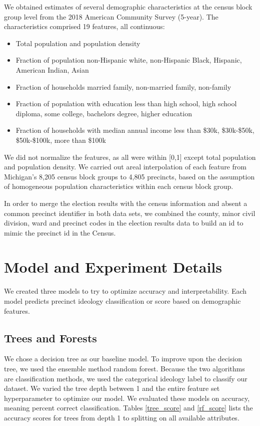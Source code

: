 \documentclass{article}
\begin{document}
We obtained estimates of several demographic characteristics at the census block group level from the 2018 American Community Survey (5-year). The characteristics comprised 19 features, all continuous:

\begin{itemize}
    \item Total population and population density 
    \item Fraction of population {non-Hispanic white, non-Hispanic Black, Hispanic, American Indian, Asian}
    \item Fraction of households {married family, non-married family, non-family}
    \item Fraction of population with education {less than high school, high school diploma, some college, bachelors degree, higher education}
    \item Fraction of households with median annual income {less than \$30k, \$30k-\$50k, \$50k-\$100k, more than \$100k}
\end{itemize}
We did not normalize the features, as all were within [0,1] except total population and population density. We carried out areal interpolation of each feature from Michigan’s 8,205 census block groups to 4,805 precincts, based on the assumption of homogeneous population characteristics within each census block group. 

In order to merge the election results with the census information and absent a common precinct identifier in both data sets, we combined the county, minor civil division, ward and precinct codes in the election results data to build an id to mimic the precinct id in the Census. 


\section{Model and Experiment Details}


We created three models to try to optimize  accuracy and interpretability. Each model 
predicts precinct ideology classification or score based on demographic features.

\subsection{Trees and Forests}

We chose a decision tree as our baseline model. To improve upon the decision tree, we used the ensemble method random forest. Because the two algorithms are classification methods, we used the  categorical ideology label to classify our dataset. We varied the tree depth between 1 and the entire feature set hyperparameter to optimize our model. We evaluated these models on accuracy, meaning percent correct classification. Tables \ref{tree_score} and \ref{rf_score} lists the accuracy scores for trees from depth 1 to splitting on all available attributes. 
\end{document}
